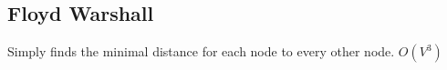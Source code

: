 \subsection{Floyd Warshall}

Simply finds the minimal distance for each node to every other node.  $ O(V^3) $
